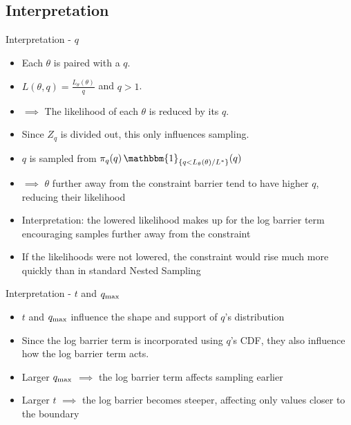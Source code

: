 \documentclass[]{beamer}
\begin{document}
  \subsection{Interpretation}
  \begin{frame}{Interpretation - $q$}
    \begin{itemize}
      \item Each $\theta$ is paired with a $q$. \pause
      \item $L(\theta, q) = \frac{L_\theta(\theta)}{q}$ and $q > 1$. \pause
      \item $\implies$ The likelihood of each $\theta$ is reduced by its $q$. \pause
      \item Since $Z_q$ is divided out, this only influences sampling. \pause
      \item $q$ is sampled from $\pi_q(q) \, \mathbbm{1}_{\{q < L_\theta(\theta) / L^*\}}(q)$ \pause
      \item $\implies$ $\theta$ further away from the constraint barrier tend to have higher $q$, reducing their likelihood \pause
      \item Interpretation: the lowered likelihood makes up for the log barrier term encouraging samples further away from the constraint \pause
      \item If the likelihoods were not lowered, the constraint would rise much more quickly than in standard Nested Sampling
    \end{itemize}
  \end{frame}
  \begin{frame}{Interpretation - $t$ and $q_{\textnormal{max}}$}
    \begin{itemize}
      \item $t$ and $q_{\textnormal{max}}$ influence the shape and support of $q$'s distribution \pause
      \item Since the log barrier term is incorporated using $q$'s CDF, they also influence how the log barrier term acts. \pause
      \item Larger $q_{\textnormal{max}}$ $\implies$ the log barrier term affects sampling earlier \pause
      \item Larger $t$ $\implies$ the log barrier becomes steeper, affecting only values closer to the boundary
    \end{itemize}
  \end{frame}
\end{document}
